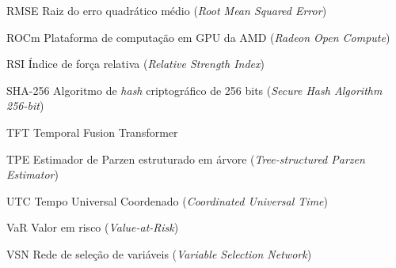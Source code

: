 \begin{siglas}
    \item[RMSE] Raiz do erro quadrático médio (\textit{Root Mean Squared Error})
    \item[ROCm] Plataforma de computação em GPU da AMD (\textit{Radeon Open Compute})
    \item[RSI] Índice de força relativa (\textit{Relative Strength Index})
    \item[SHA-256] Algoritmo de \textit{hash} criptográfico de 256 bits (\textit{Secure Hash Algorithm 256-bit})
    \item[TFT] Temporal Fusion Transformer
    \item[TPE] Estimador de Parzen estruturado em árvore (\textit{Tree-structured Parzen Estimator})
    \item[UTC] Tempo Universal Coordenado (\textit{Coordinated Universal Time})
    \item[VaR] Valor em risco (\textit{Value-at-Risk})
    \item[VSN] Rede de seleção de variáveis (\textit{Variable Selection Network})
\end{siglas}
